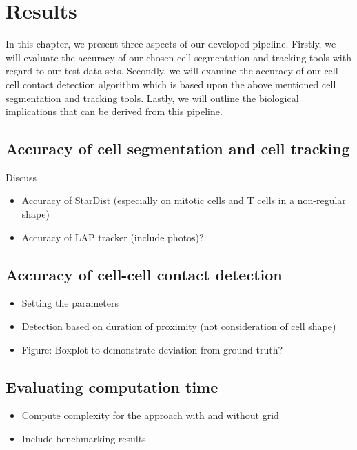 \documentclass{report}
\begin{document}
\allsectionsfont{\sffamily}
\onehalfspacing

\setlength\parindent{0pt}
  

\chapter{Results}

In this chapter, we present three aspects of our developed pipeline. Firstly, we will evaluate the accuracy of our chosen cell segmentation and tracking tools with regard to our test data sets. Secondly, we will examine the accuracy of our cell-cell contact detection algorithm which is based upon the above mentioned cell segmentation and tracking tools. Lastly, we will outline the biological implications that can be derived from this pipeline.

\section{Accuracy of cell segmentation and cell tracking}

Discuss
\begin{itemize}
	\item Accuracy of StarDist (especially on mitotic cells and T cells in a non-regular shape)
	\item Accuracy of LAP tracker (include photos)?
\end{itemize}

\section{Accuracy of cell-cell contact detection}

\begin{itemize}
	\item Setting the parameters
	\item Detection based on duration of proximity (not consideration of cell shape)
	\item Figure: Boxplot to demonstrate deviation from ground truth?
\end{itemize}

\section{Evaluating computation time}

\begin{itemize}
	\item Compute complexity for the approach with and without grid
	\item Include benchmarking results
\end{itemize}
\end{document}
